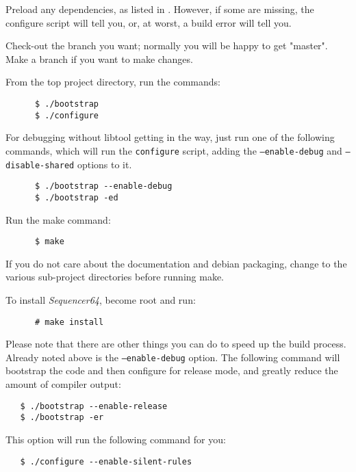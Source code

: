    \begin{enumber}
      \item Preload any dependencies, as listed in
         .
          However, if some are missing, the configure script will tell you,
          or, at worst, a build error will tell you.
      \item Check-out the branch you want; normally you will be happy to
         get "master".  Make a branch if you want to make changes.
      \item From the top project directory, run the commands:
\begin{verbatim}
      $ ./bootstrap
      $ ./configure
\end{verbatim}
      \item For debugging without libtool getting in the way, just run
         one of the following commands, which will run the
         \texttt{configure} script, adding the
         \texttt{--enable-debug} and
         \texttt{--disable-shared} options to it.
\begin{verbatim}
      $ ./bootstrap --enable-debug
      $ ./bootstrap -ed
\end{verbatim}
      \item Run the make command:
\begin{verbatim}
      $ make
\end{verbatim}
      If you do not care about the documentation and debian packaging,
      change to the various sub-project directories before running make.
      \item To install \textsl{Sequencer64}, become root and run:
\begin{verbatim}
      # make install
\end{verbatim}
   \end{enumber}

   Please note that there are other things you can do to speed up the build
   process.  Already noted above is the \texttt{--enable-debug} option.
   The following command will bootstrap the code and then configure
   for release mode, and greatly reduce the amount of compiler output:
      
\begin{verbatim}
   $ ./bootstrap --enable-release
   $ ./bootstrap -er
\end{verbatim}

   This option will run the following command for you:

\begin{verbatim}
   $ ./configure --enable-silent-rules
\end{verbatim}

